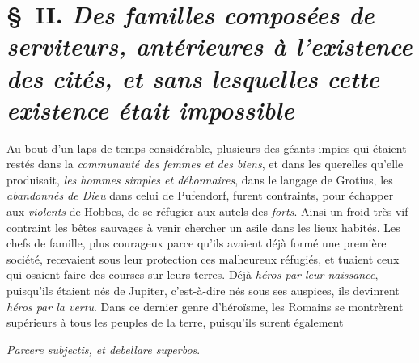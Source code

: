 \documentclass[french,twoside]{book} %
\begin{document}
\section[{§ II. Des familles composées de serviteurs, antérieures à l’existence des cités, et sans lesquelles cette existence était impossible}]{§ II. {\itshape Des familles composées de serviteurs, antérieures à l’existence des cités, et sans lesquelles cette existence était impossible}}
\noindent Au bout d’un laps de temps considérable, plusieurs des géants impies qui étaient restés dans la {\itshape communauté des femmes et des biens}, et dans les querelles qu’elle produisait, {\itshape les hommes simples et débonnaires}, dans le langage de Grotius, les {\itshape abandonnés de Dieu} dans celui de Pufendorf, furent contraints, pour échapper aux {\itshape violents} de Hobbes, de se réfugier aux autels des {\itshape forts}. Ainsi un froid très vif contraint les bêtes sauvages à venir chercher un asile dans les lieux habités. Les chefs de famille, plus courageux parce qu’ils avaient déjà formé une première société, recevaient sous leur  protection ces malheureux réfugiés, et tuaient ceux qui osaient faire des courses sur leurs terres. Déjà {\itshape héros par leur naissance}, puisqu’ils étaient nés de Jupiter, c’est-à-dire nés sous ses auspices, ils devinrent {\itshape héros par la vertu}. Dans ce dernier genre d’héroïsme, les Romains se montrèrent supérieurs à tous les peuples de la terre, puisqu’ils surent également\par

{\itshape Parcere subjectis, et debellare superbos}.\\
\end{document}
